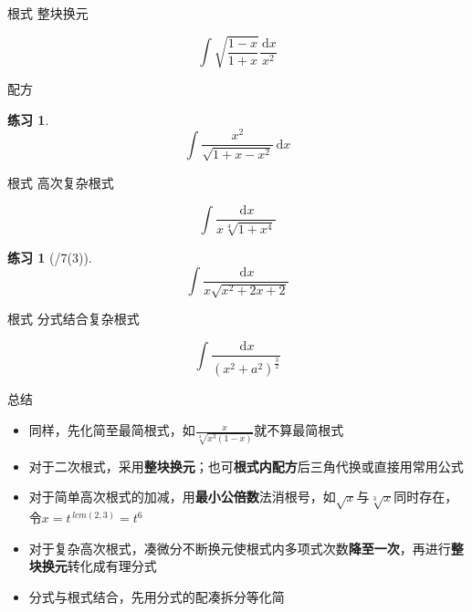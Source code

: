 \documentclass[UTF8]{ctexbeamer}
\def\diff{\,\mathrm{d}}
\newtheorem{exercise}[theorem]{练习} %
\begin{document}
\begin{frame}{根式}
整块换元
\begin{example}
\[\int\sqrt{\frac{1-x}{1+x}}\frac{\diff x}{x^2}\]
\end{example}
配方
\begin{exercise}
\[\int \frac{x^2}{\sqrt{1+x-x^2}}\diff x\]
\end{exercise}
\end{frame}

\begin{frame}{根式}
高次复杂根式
\begin{example}[\textsection 6.2/7(9)]
\[\int \frac{\diff x}{x\sqrt[4]{1+x^4}}\]
\end{example}
\begin{exercise}[/7(3)]
\[\int \frac{\diff x}{x\sqrt{x^2+2x+2}}\]
\end{exercise}
\end{frame}

\begin{frame}{根式}
分式结合复杂根式
\begin{example}
\[\int \frac{\diff x}{(x^2+a^2)^{\frac{3}{2}}}\]
\end{example}
\end{frame}

\begin{frame}{总结}
\begin{itemize}
	\item 同样，先化简至最简根式，如$\displaystyle\frac{x}{\sqrt[4]{x^3(1-x)}}$就不算最简根式
	\item 对于二次根式，采用\textbf{整块换元}；也可\textbf{根式内配方}后三角代换或直接用常用公式
	\item 对于简单高次根式的加减，用\textbf{最小公倍数}法消根号，如$\sqrt{x}$与$\sqrt[3]{x}$同时存在，令$x=t^{\,lcm(2,3)}=t^6$
	\item 对于复杂高次根式，凑微分不断换元使根式内多项式次数\textbf{降至一次}，再进行\textbf{整块换元}转化成有理分式
	\item 分式与根式结合，先用分式的配凑拆分等化简
\end{itemize}
\end{frame}
\end{document}
